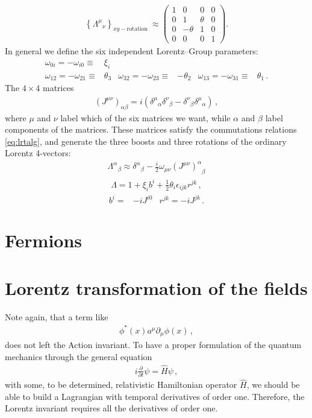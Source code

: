 \begin{align}
  \left\{{\Lambda^\mu}_{\nu}\right\}_{xy-\text{rotation }}\approx
  \begin{pmatrix}
    1&0&0&0\\
    0&1&\theta&0\\
    0&-\theta&1&0\\
    0&0&0&1
  \end{pmatrix}.
\end{align}
In general we define the six independent Lorentz--Group parameters:
\begin{align}
  \omega_{0i}=-\omega_{i0}\equiv&\xi_i \nonumber\\
  \omega_{12}=-\omega_{21}\equiv&\theta_3 &   \omega_{32}=-\omega_{23}\equiv&-\theta_2 &   \omega_{13}=-\omega_{31}\equiv&\theta_1\,.
\end{align}
The $4\times 4$ matrices
\begin{align}
  \left(J^{\mu\nu}\right)_{\alpha\beta}=i\left({\delta^\mu}_\alpha{\delta^\nu}_\beta-{\delta^\nu}_\beta{\delta^\mu}_\alpha\right)\,,
\end{align}
where $\mu$ and $\nu$ label which of the six matrices we want, while $\alpha$ and $\beta$ label components of the matrices. These matrices satisfy the commutations relations \eqref{eq:lrtalg}, and generate the three boosts and three rotations of the ordinary Lorentz 4-vectors:
\begin{align}
  {\Lambda^\alpha}_\beta\approx{\delta^\alpha}_\beta-\frac{i}{2}\omega_{\mu\nu}{\left(J^{\mu\nu}\right)^\alpha}_\beta
\end{align}
\begin{align}
\label{eq:lorentzrep}
  \Lambda=1+\xi_ib^i+\frac{1}{2}\theta_i\epsilon_{i j k}r^{jk}\,,
\end{align}
\begin{align}
 b^i=&-i J^{i0} & r^{jk}=-i J^{j k}\,.
\end{align}




\section{Fermions}

\section{Lorentz transformation of the fields}

Note again, that a term like
\begin{align}
\label{eq:nolor}
  \phi^*(x)a^\mu\partial_\mu\phi(x)\,,
\end{align}
does not left the Action invariant. To have a proper formulation of the quantum mechanics through the general equation
\begin{align}
  i\frac{\partial}{\partial t}\psi=\hat{H} \psi\,,  
\end{align}
with some, to be determined, relativistic Hamiltonian operator $\widehat{H}$, we should be able to build a Lagrangian with temporal derivatives of order one. Therefore, the Lorentz invariant requires all the derivatives of order one.  

